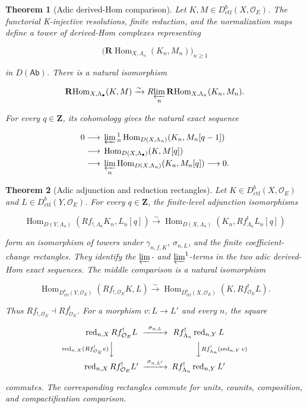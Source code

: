 \documentclass[10pt]{article}
\newtheorem{theorem}{Theorem}[section]
\theoremstyle{definition}
\newcommand{\OO}{\mathcal O}
\newcommand{\Dctf}{D^b_{\mathrm{ctf}}}
\newcommand{\HomD}{\operatorname{Hom}}
\newcommand{\red}{\operatorname{red}}
\begin{document}
\begin{theorem}[Adic derived-Hom comparison]
Let \(K,M\in\Dctf(X,\OO_E)\).  The functorial K-injective resolutions,
finite reduction, and the normalization maps define a tower of derived-Hom
complexes representing

\[
 \bigl(\mathbf R\!\operatorname{Hom}_{X,\Lambda_n}(K_n,M_n)\bigr)_{n\geq1}
\]

in \(D(\mathsf{Ab})\).  There is a natural isomorphism

\[
 \mathbf R\!\operatorname{Hom}_{X,\Lambda_\bullet}(K,M)
 \xrightarrow{\sim}
 R\!\varprojlim_n
 \mathbf R\!\operatorname{Hom}_{X,\Lambda_n}(K_n,M_n).
\]

For every \(q\in\mathbf Z\), its cohomology gives the natural exact sequence

\[
\begin{aligned}
0\longrightarrow{}&\varprojlim
{}^{1}_n\operatorname{Hom}_{D(X,\Lambda_n)}(K_n,M_n[q-1])\\
\longrightarrow{}&\operatorname{Hom}_{D(X,\Lambda_\bullet)}(K,M[q])\\
\longrightarrow{}&\varprojlim_n
\operatorname{Hom}_{D(X,\Lambda_n)}(K_n,M_n[q])
\longrightarrow0.
\end{aligned}
\]
\end{theorem}

\begin{theorem}[Adic adjunction and reduction rectangles]
Let \(K\in\Dctf(X,\OO_E)\) and \(L\in\Dctf(Y,\OO_E)\).  For every
\(q\in\mathbf Z\), the finite-level adjunction isomorphisms

\[
 \operatorname{Hom}_{D(Y,\Lambda_n)}
 (Rf_{!,\Lambda_n}K_n,L_n[q])
 \xrightarrow{\sim}
 \operatorname{Hom}_{D(X,\Lambda_n)}
 (K_n,Rf^!_{\Lambda_n}L_n[q])
\]

form an isomorphism of towers under \(\gamma_{n,f,K}\),
\(\sigma_{n,L}\), and the finite coefficient-change rectangles.  They
identify the \(\varprojlim\)- and \(\varprojlim^1\)-terms in the two adic
derived-Hom exact sequences.  The middle comparison is a natural isomorphism

\[
 \HomD_{\Dctf(Y,\OO_E)}(Rf_{!,\OO_E}K,L)
 \xrightarrow{\sim}
 \HomD_{\Dctf(X,\OO_E)}(K,Rf^!_{\OO_E}L).
\]

Thus \(Rf_{!,\OO_E}\dashv Rf^!_{\OO_E}\).  For a morphism
\(v:L\to L'\) and every \(n\), the square

\[
\begin{CD}
\red_{n,X}Rf^!_{\OO_E}L @>{\sigma_{n,L}}>>
 Rf^!_{\Lambda_n}\red_{n,Y}L\\
@V{\red_{n,X}(Rf^!_{\OO_E}v)}VV
 @VV{Rf^!_{\Lambda_n}(\red_{n,Y}v)}V\\
\red_{n,X}Rf^!_{\OO_E}L' @>{\sigma_{n,L'}}>>
 Rf^!_{\Lambda_n}\red_{n,Y}L'
\end{CD}
\]

commutes.  The corresponding rectangles commute for units, counits,
composition, and compactification comparison.
\end{theorem}
\end{document}
